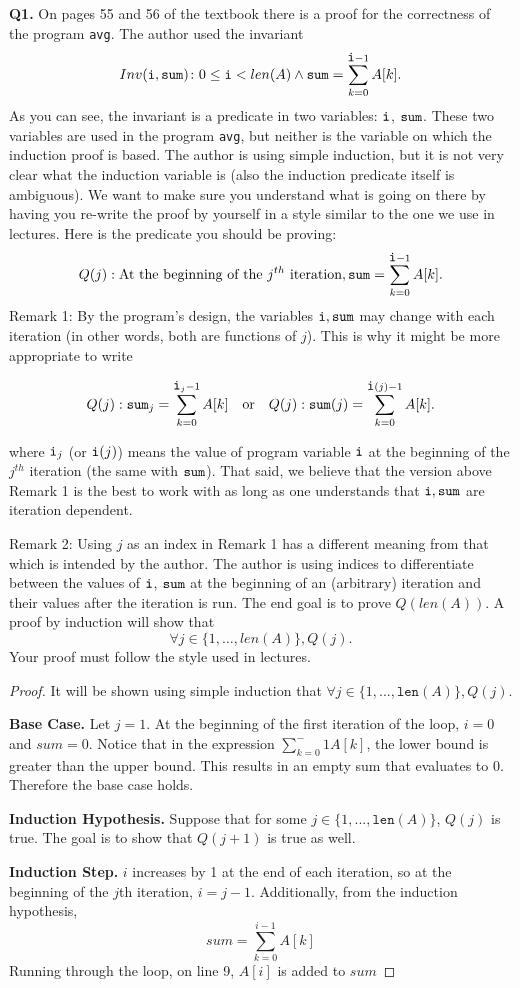 \documentclass[11pt]{article}
\begin{document}
    \textbf{Q1.} On pages 55 and 56 of the textbook there is a proof for the correctness of the program \verb|avg|. The author used the invariant $$Inv(\verb|i|,\verb|sum|)\colon 0\leq \verb|i| < len(A) \wedge \verb|sum|=\sum_{k=0}^{\verb|i|-1}A[k].$$
    As you can see, the invariant is a predicate in two variables: $\verb|i|$, $\verb|sum|$. These two variables are used in the program \verb|avg|, but neither is the variable on which the induction proof is based.
    The author is using simple induction, but it is not very clear what the induction variable is (also the induction predicate itself is ambiguous). We want to make sure you understand what is going on there by having you re-write the proof by yourself in a style similar to the one we use in lectures. Here is the predicate
    you should be proving:
    $$Q(j): \text{At the beginning of the } j^{th} \text{ iteration}, \verb|sum|=\sum_{k=0}^{\verb|i|-1}A[k].$$
    Remark 1: By the program's design, the variables $\verb|i|,\verb|sum|$ may change with each iteration (in other words, both are functions of $j$). This is why it might be more appropriate to write
    
    $$Q(j): \verb|sum|_j=\sum_{k=0}^{\verb|i|_j-1}A[k] \quad \text{or} \quad Q(j): \verb|sum|(j)=\sum_{k=0}^{\verb|i|(j)-1}A[k].$$

    where $\verb|i|_j$ (or $\verb|i|(j)$) means the value of program variable $\verb|i|$ at the beginning of the $j^{th}$ iteration (the same with $\verb|sum|$).
    That said, we believe that the version above Remark 1 is the best to work with as long as one understands that $\verb|i|,\verb|sum|$ are iteration dependent.

    Remark 2: Using $j$ as an index in Remark 1 has a different meaning from that which is intended by the author. The author is using indices to differentiate between the values of $\verb|i|$, $\verb|sum|$ at the beginning of an (arbitrary) iteration and
    their values after the iteration is run.
    \medskip
    The end goal is to prove $Q(len(A))$. A proof by induction will show that $$\forall
    j\in\{1,\ldots,len(A)\}, Q(j).$$ Your proof must follow the style used in lectures.

    \begin{proof}
        It will be shown using simple induction that \(\forall j \in \{1,..., \texttt{len}(A) \},Q(j)\).

        \textbf{Base Case.} Let \(j = 1\). At the beginning of the first iteration of the loop, \(i=0\) and \(sum=0\). Notice that in the expression \(\sum_{k=0} ^-1 A[k]\), the lower bound is greater than the upper bound. This results in an empty sum that evaluates to \(0\). Therefore the base case holds.

        \textbf{Induction Hypothesis.} Suppose that for some \(j \in \{1,..., \texttt{len}(A)\}\), \(Q(j)\) is true. The goal is to show that \(Q(j+1)\) is true as well.

        \textbf{Induction Step.} \(i\) increases by 1 at the end of each iteration, so at the beginning of the \(j\)th iteration, \(i = j-1\). Additionally, from the induction hypothesis,
        \[
            sum = \sum_{k=0}^{i-1} A[k]
        \]
        Running through the loop, on line 9, \(A[i]\) is added to \(sum\) 
    \end{proof}
\end{document}
